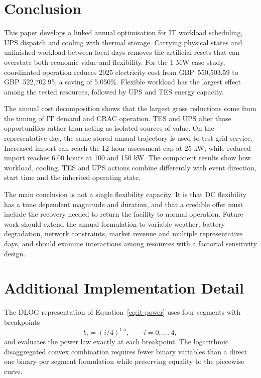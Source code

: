 \section{Conclusion}

This paper develops a linked annual optimisation for IT workload scheduling,
UPS dispatch and cooling with thermal storage. Carrying physical states and
unfinished workload between local days removes the artificial resets that can
overstate both economic value and flexibility. For the 1 MW case study,
coordinated operation reduces 2025 electricity cost from GBP~550,503.59 to
GBP~522,702.95, a saving of 5.050\%. Flexible workload has the largest effect
among the tested resources, followed by UPS and TES energy capacity.

The annual cost decomposition shows that the largest gross reductions come from
the timing of IT demand and CRAC operation. TES and UPS alter those opportunities
rather than acting as isolated sources of value. On the representative day, the
same stored annual trajectory is used to test grid service. Increased import can
reach the 12 hour assessment cap at 25 kW, while reduced import reaches 6.00 hours
at 100 and 150 kW. The component results show how workload, cooling, TES and UPS
actions combine differently with event direction, start time and the inherited
operating state.

The main conclusion is not a single flexibility capacity. It is that
DC flexibility has a time dependent magnitude and duration, and that a
credible offer must include the recovery needed to return the facility to normal
operation. Future work should extend the annual formulation to variable weather,
battery degradation, network constraints, market revenue and multiple
representative days, and should examine interactions among resources with a
factorial sensitivity design.

\appendices
\section{Additional Implementation Detail}\label{app:implementation}

The DLOG representation of Equation~\eqref{eq:it-power} uses four segments with
breakpoints
\begin{equation}
 b_i=(i/4)^{1.5},\qquad i=0,\ldots,4,
 \label{eq:appendix-breakpoints}
\end{equation}
and evaluates the power law exactly at each breakpoint. The logarithmic
disaggregated convex combination requires fewer binary variables than a direct
one binary per segment formulation while preserving equality to the piecewise
curve.

